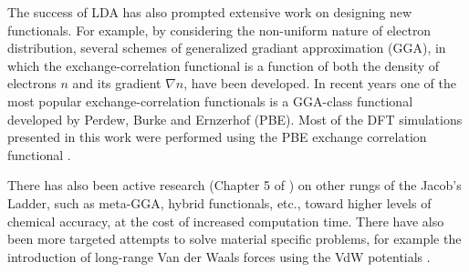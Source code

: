 The success of LDA has also prompted extensive work on designing new functionals. For
example, by considering the non-uniform nature of electron distribution, several
schemes of generalized gradiant approximation (GGA), in which the
exchange-correlation functional is a function of both the density of electrons $n$
and its gradient $\nabla n$, have been developed. In recent years one of the most
popular exchange-correlation functionals is a GGA-class functional developed by
Perdew, Burke and Ernzerhof \citep{Perdew1996} (PBE). Most of the DFT simulations
presented in this work were performed using the PBE exchange correlation functional .

There has also been active research (Chapter 5 of \cite{martin-esbook}) on other
rungs of the Jacob's Ladder, such as meta-GGA, hybrid functionals, etc., toward
higher levels of chemical accuracy, at the cost of increased computation time. There
have also been more targeted attempts to solve material specific problems, for
example the introduction of long-range Van der Waals forces using the VdW potentials
\citep{Raymond2015}.


